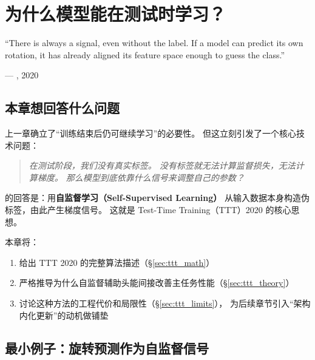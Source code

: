 \chapter{为什么模型能在测试时学习？}
\label{ch:why_test_time}

\epigraph{``There is always a signal, even without the label. If a model can predict its own rotation, it has already aligned its feature space enough to guess the class.''}{--- \citeauthor{sun2020ttt}, 2020}

\section{本章想回答什么问题}
\label{sec:ttt_question}

上一章确立了``训练结束后仍可继续学习''的必要性。
但这立刻引发了一个核心技术问题：

\begin{quote}
\textit{在测试阶段，我们没有真实标签。
没有标签就无法计算监督损失，无法计算梯度。
那么模型到底依靠什么信号来调整自己的参数？}
\end{quote}

\citet{sun2020ttt} 的回答是：用\textbf{自监督学习（Self-Supervised Learning）}
从输入数据本身构造伪标签，由此产生梯度信号。
这就是 Test-Time Training（TTT）2020 的核心思想。

本章将：
\begin{enumerate}
  \item 给出 TTT 2020 的完整算法描述（\S\ref{sec:ttt_math}）
  \item 严格推导为什么自监督辅助头能间接改善主任务性能（\S\ref{sec:ttt_theory}）
  \item 讨论这种方法的工程代价和局限性（\S\ref{sec:ttt_limits}），
        为后续章节引入``架构内化更新''的动机做铺垫
\end{enumerate}

\section{最小例子：旋转预测作为自监督信号}
\label{sec:ttt_minimal}


